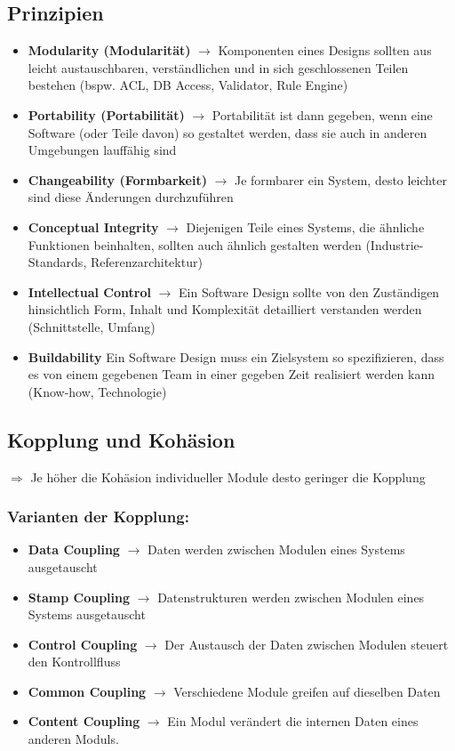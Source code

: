 \documentclass{report}
\theoremstyle{definition}
\theoremstyle{example}
\begin{document}
\subsection{Prinzipien}
\begin{itemize}
	\item \textbf{Modularity (Modularität)} $\rightarrow$ Komponenten eines Designs sollten aus leicht austauschbaren, verständlichen und in sich geschlossenen Teilen bestehen (bspw. ACL, DB Access, Validator, Rule Engine)
	\item  \textbf{Portability (Portabilität)} $\rightarrow$ Portabilität ist dann gegeben, wenn eine Software (oder Teile davon) so gestaltet werden, dass sie auch in anderen Umgebungen lauffähig sind
	\item \textbf{Changeability (Formbarkeit)} $\rightarrow$ Je formbarer ein System, desto leichter sind diese Änderungen durchzuführen
	\item \textbf{Conceptual Integrity} $\rightarrow$ Diejenigen Teile eines Systems, die ähnliche Funktionen beinhalten, sollten auch ähnlich gestalten werden (Industrie-Standards, Referenzarchitektur)
	\item \textbf{Intellectual Control} $\rightarrow$ Ein Software Design sollte von den Zuständigen hinsichtlich Form, Inhalt und Komplexität detailliert verstanden werden (Schnittstelle, Umfang)
	\item \textbf{Buildability} Ein Software Design muss ein Zielsystem so spezifizieren, dass es von einem gegebenen Team in einer gegeben Zeit realisiert werden kann (Know-how, Technologie)
\end{itemize}

\subsection{Kopplung und Kohäsion}
$\Rightarrow$ Je höher die Kohäsion individueller Module desto geringer die Kopplung

\subsubsection{Varianten der Kopplung:}
\begin{itemize}
	\item \textbf{Data Coupling} $\rightarrow$ Daten werden zwischen Modulen eines Systems ausgetauscht
	\item \textbf{Stamp Coupling} $\rightarrow$ Datenstrukturen werden zwischen Modulen eines Systems ausgetauscht
	\item \textbf{Control Coupling} $\rightarrow$ Der Austausch der Daten zwischen Modulen steuert den Kontrollfluss
	\item \textbf{Common Coupling} $\rightarrow$ Verschiedene Module greifen auf dieselben Daten
	\item \textbf{Content Coupling} $\rightarrow$ Ein Modul verändert die internen Daten eines anderen Moduls.
\end{itemize}
\end{document}
